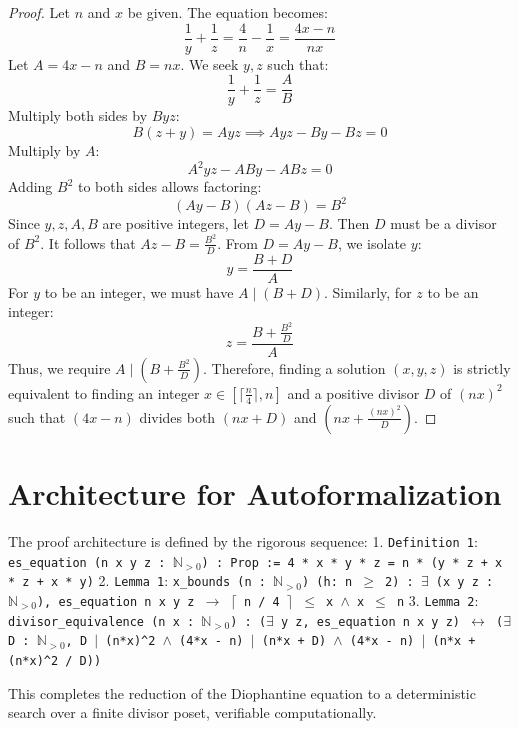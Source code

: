 \documentclass[12pt,a4paper]{article}
\begin{document}
\begin{proof}
Let $n$ and $x$ be given. The equation becomes:
\begin{equation}
\frac{1}{y} + \frac{1}{z} = \frac{4}{n} - \frac{1}{x} = \frac{4x - n}{nx}
\end{equation}
Let $A = 4x - n$ and $B = nx$. We seek $y, z$ such that:
\begin{equation}
\frac{1}{y} + \frac{1}{z} = \frac{A}{B}
\end{equation}
Multiply both sides by $Byz$:
\begin{equation}
B(z + y) = Ayz \implies Ayz - By - Bz = 0
\end{equation}
Multiply by $A$:
\begin{equation}
A^2 y z - AB y - AB z = 0
\end{equation}
Adding $B^2$ to both sides allows factoring:
\begin{equation}
(Ay - B)(Az - B) = B^2
\end{equation}
Since $y, z, A, B$ are positive integers, let $D = Ay - B$. Then $D$ must be a divisor of $B^2$. It follows that $Az - B = \frac{B^2}{D}$.
From $D = Ay - B$, we isolate $y$:
\begin{equation}
y = \frac{B + D}{A}
\end{equation}
For $y$ to be an integer, we must have $A \mid (B + D)$.
Similarly, for $z$ to be an integer:
\begin{equation}
z = \frac{B + \frac{B^2}{D}}{A}
\end{equation}
Thus, we require $A \mid (B + \frac{B^2}{D})$.
Therefore, finding a solution $(x,y,z)$ is strictly equivalent to finding an integer $x \in [\lceil \frac{n}{4} \rceil, n]$ and a positive divisor $D$ of $(nx)^2$ such that $(4x - n)$ divides both $(nx + D)$ and $(nx + \frac{(nx)^2}{D})$.
\end{proof}

\section{Architecture for Autoformalization}
The proof architecture is defined by the rigorous sequence:
1. \texttt{Definition 1}: \texttt{es\_equation (n x y z : \(\mathbb{N}_{>0}\)) : Prop := 4 * x * y * z = n * (y * z + x * z + x * y)}
2. \texttt{Lemma 1}: \texttt{x\_bounds (n : \(\mathbb{N}_{>0}\)) (h: n \(\geq\) 2) : \(\exists\) (x y z : \(\mathbb{N}_{>0}\)), es\_equation n x y z \(\to\) \(\lceil\) n / 4 \(\rceil\) \(\leq\) x \(\land\) x \(\leq\) n}
3. \texttt{Lemma 2}: \texttt{divisor\_equivalence (n x : \(\mathbb{N}_{>0}\)) : (\(\exists\) y z, es\_equation n x y z) \(\leftrightarrow\) (\(\exists\) D : \(\mathbb{N}_{>0}\), D \(\mid\) (n*x)\textasciicircum 2 \(\land\) (4*x - n) \(\mid\) (n*x + D) \(\land\) (4*x - n) \(\mid\) (n*x + (n*x)\textasciicircum 2 / D))}

This completes the reduction of the Diophantine equation to a deterministic search over a finite divisor poset, verifiable computationally.
\end{document}
